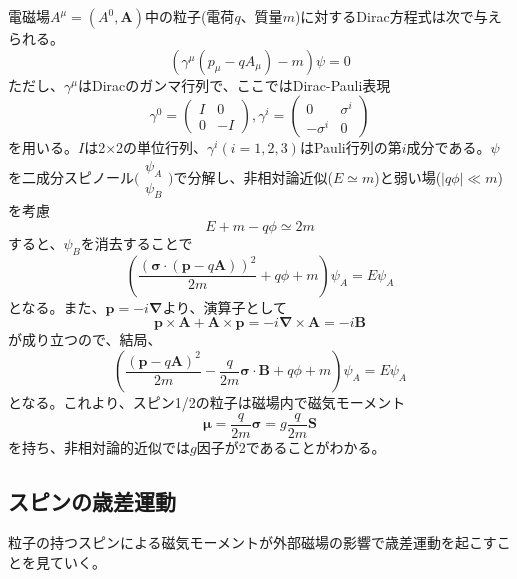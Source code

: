 \documentclass{jsarticle}
\begin{document}
電磁場$A^{\mu}=(A^0,\bm{A})$中の粒子(電荷$q$、質量$m$)に対するDirac方程式は次で与えられる。
\begin{equation}
(\gamma^{\mu}(p_{\mu}-qA_{\mu})-m)\psi=0
\end{equation}
ただし、$\gamma^{\mu}$はDiracのガンマ行列で、ここではDirac-Pauli表現
\begin{equation}
\gamma^0=\begin{pmatrix} I & 0 \\ 0 & -I \end{pmatrix},
\gamma^i=\begin{pmatrix} 0 & \sigma^i \\ -\sigma^i & 0 \end{pmatrix}
\end{equation}
を用いる。$I$は2×2の単位行列、$\gamma^i(i=1,2,3)$はPauli行列の第$i$成分である。$\psi$を二成分スピノール$\bigl( \begin{smallmatrix} \psi_A \\ \psi_B \end{smallmatrix} \bigr)$で分解し、非相対論近似($E\simeq m$)と弱い場($|q\phi|\ll m$)を考慮
\begin{equation}
E+m-q\phi\simeq2m
\end{equation}
すると、$\psi_B$を消去することで
\begin{equation}
(\frac{(\bm{\sigma}\cdot(\bm{p}-q\bm{A}))^2}{2m}+q\phi+m)\psi_A=E\psi_A
\end{equation}
となる。また、$\bm{p}=-i\bm{\nabla}$より、演算子として
\begin{equation}
\bm{p}\times\bm{A}+\bm{A}\times\bm{p}=-i\bm{\nabla}\times\bm{A}=-i\bm{B}
\end{equation}
が成り立つので、結局、
\begin{equation}
(\frac{(\bm{p}-q\bm{A})^2}{2m}-\frac{q}{2m}\bm{\sigma}\cdot\bm{B}+q\phi+m)\psi_A=E\psi_A
\end{equation}
となる。これより、スピン1/2の粒子は磁場内で磁気モーメント
\begin{equation}
\bm{\mu}=\frac{q}{2m}\bm{\sigma}=g\frac{q}{2m}\bm{S}
\end{equation}
を持ち、非相対論的近似では$g$因子が2であることがわかる。
\subsection{スピンの歳差運動}
粒子の持つスピンによる磁気モーメントが外部磁場の影響で歳差運動を起こすことを見ていく。
\end{document}
